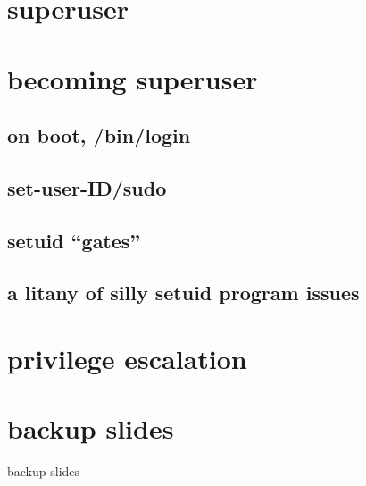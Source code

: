 \section{superuser}


\section{becoming superuser}

\subsection{on boot, /bin/login}


\subsection{set-user-ID/sudo}




\subsection{setuid ``gates''}


\subsection{a litany of silly setuid program issues}


\section{privilege escalation}




\section{backup slides}
\begin{frame}{backup slides}
\end{frame}



